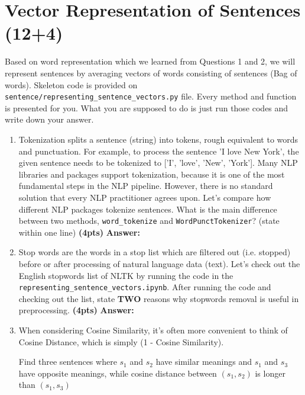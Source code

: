 \documentclass{assignment format}
\newenvironment{answer}{
    {\bf Answer:} \begingroup\color{red}
}{\endgroup}%
\begin{document}
\section{Vector Representation of Sentences (12+4)}
Based on word representation which we learned from Questions 1 and 2, we will represent sentences by averaging vectors of words consisting of sentences (Bag of words). Skeleton code is provided on \texttt{sentence/}\texttt{representing}\newline\texttt{\_sentence}\texttt{\_vectors.py} file. Every method and function is presented for you. What you are supposed to do is just run those codes and write down your answer.
\begin{enumerate}[label=(\alph*)]
\item Tokenization splits a sentence (string) into tokens, rough equivalent to words and punctuation. For example, to process the sentence 'I love New York', the given sentence needs to be tokenized to ['I', 'love', 'New', 'York']. Many NLP libraries and packages support tokenization, because it is one of the most fundamental steps in the NLP pipeline. However, there is no standard solution that every NLP practitioner agrees upon. Let's compare how different NLP packages tokenize sentences.
\newline
What is the main difference between two methods, \texttt{word\_tokenize} and \texttt{WordPunctTokenizer}? (state within one line) \textbf{(4pts)}
\begin{answer}
\end{answer}
\item Stop words are the words in a stop list which are filtered out (i.e. stopped) before or after processing of natural language data (text). Let's check out the English stopwords list of NLTK by running the code in the \texttt{representing\_sentence\_vectors.ipynb}.
\newline
After running the code and checking out the list, state \textbf{TWO} reasons why stopwords removal is useful in preprocessing. \textbf{(4pts)}
\begin{answer}
\end{answer}
\item When considering Cosine Similarity, it's often more convenient to think of Cosine Distance, which is simply (1 - Cosine Similarity).

Find three sentences where $s_1$ and $s_2$ have similar meanings and $s_1$ and $s_3$ have opposite meanings, while cosine distance between $(s_1, s_2)$ is longer than $(s_1, s_3)$  


\end{enumerate}
\end{document}
